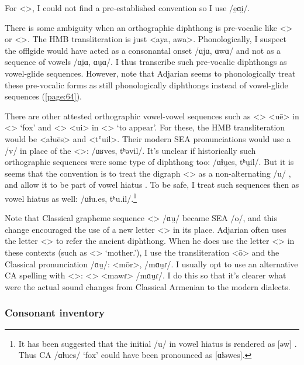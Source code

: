 For <>, I could not find a pre-established convention so I use /e̯ɑi̯/. 
	
There is some ambiguity when an orthographic diphthong is pre-vocalic like <> or <>. The HMB transliteration is just <aya, awa>. Phonologically, I suspect the offlgide would have acted as a consonantal onset /ɑjɑ, ɑwɑ/ and not as a sequence of vowels /ɑi̯ɑ, ɑu̯ɑ/. I thus transcribe such pre-vocalic diphthongs as vowel-glide sequences. However, note that Adjarian seems to phonologically treat these pre-vocalic forms as still phonologically diphthongs instead of vowel-glide sequences (\ref{page:64}). 




There are other attested orthographic vowel-vowel sequences such as <> <uē> in <> `fox' and <> <ui> in <> `to appear'. For these, the HMB transliteration would be <aɫuēs> and <tʿuil>. Their modern SEA pronunciations would use a /v/ in place of the <>: /ɑʁves, tʰəvil/. It's unclear if historically such orthographic sequences were some type of diphthong too: /ɑɫu̯es, tʰu̯il/. But it is seems that the convention is to treat the digraph <> as a non-alternating /u/ \citep[15]{Thomson-1989-IntroClassicalArmenian}, and allow it to be part of vowel hiatus \citep[17]{Thomson-1989-IntroClassicalArmenian}. To be safe, I treat such sequences then as vowel hiatus as well: /ɑɫu.es, tʰu.il/.\footnote{It has been suggested that the initial /u/ in vowel hiatus is rendered as [əw] \citep[13]{Kim-2021-phoneticsPhonologyOldArmenianWV}. Thus CA /ɑɫues/ `fox' could have been pronounced as [ɑɫəwes].}

Note that Classical grapheme sequence <> /ɑu̯/ became SEA /o/, and this change encouraged the use of a new letter <> in its place. Adjarian often uses the letter <> to refer the ancient diphthong. When he does use the letter <> in these contexts (such as <> `mother.{\gen}'), I use the transliteration <ō> and the Classical pronunciation /ɑu̯/: <mōr>, /mɑu̯ɾ/. I usually opt to use an alternative CA spelling with <>: <> <mawɾ> /mɑu̯ɾ/. I do this so that it's clearer what were the actual sound changes from Classical Armenian to the modern dialects. 


\subsubsection{Consonant inventory}\label{sec:HossepIntro:phonotransc:CA:cons}




